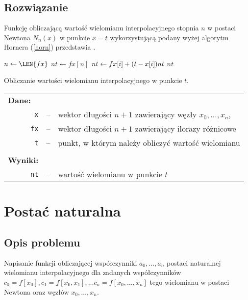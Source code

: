 \documentclass[11pt]{mk-polish-lab-report}
\let\times\relax%
\DeclareMathOperator{\times}{\cdot}
\begin{document}
\subsection{Rozwiązanie}

Funkcję obliczającą wartość wielomianu interpolacyjnego stopnia $n$ w postaci Newtona $N_{n}(x)$ w punkcie $x = t$ wykorzystującą podany wyżej algorytm Hornera (\ref{horn}) przedstawia .

\begin{algorithm}[h]
				\DontPrintSemicolon
		    	
    			 {
		    		$n \gets \LEN{fx}$\;
		    		$nt \gets fx[n]$\;
		    		 {
		    			$nt \gets fx[i] + (t - x[i]) \times nt$\; 		
		    		}
		    		\KwRet $nt$\;
    			}
    			\caption{Obliczanie wartości wielomianu interpolacyjnego w punkcie $t$.}
    			\label{alg:zad2}
		\end{algorithm}			
\begin{longtable}[l]{r  c  l}
\multicolumn{1}{l}{\textbf{Dane:}}&& \\
\texttt{x}&--&wektor długości $n+1$ zawierający węzły $x_0, \ldots, x_n$, \\
\texttt{fx}&--&wektor długości $n+1$ zawierający ilorazy różnicowe \\
\texttt{t}&--&punkt, w którym należy obliczyć wartość wielomianu \\
&& \\
\multicolumn{1}{l}{\textbf{Wyniki:}}&& \\
\texttt{nt}&--&wartość wielomianu w punkcie $t$ \\
\end{longtable}


\section{Postać naturalna}

\subsection{Opis problemu}
Napisanie funkcji obliczającej współczynniki $a_0,\ldots,a_n$ postaci naturalnej wielomianu interpolacyjnego dla zadanych współczynników $c_0 = f[x_0], c_1 = f[x_0,x_1], \ldots c_n = f[x_0, \ldots, x_n]$ tego wielomianu w postaci Newtona oraz węzłów $x_0, \ldots, x_n$. 
\end{document}

